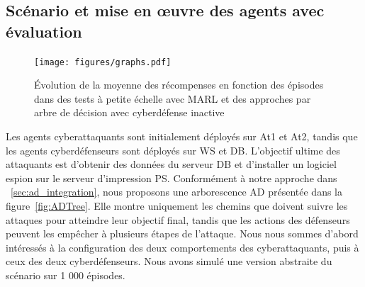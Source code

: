 


\subsection{Scénario et mise en œuvre des agents avec évaluation}

\begin{figure}
    \centering
    \texttt{[image: figures/graphs.pdf]}
    \caption{Évolution de la moyenne des récompenses en fonction des épisodes dans des tests à petite échelle avec MARL et des approches par arbre de décision avec cyberdéfense inactive
    }
    \label{fig:graphs}
\end{figure}

\noindent
Les agents cyberattaquants sont initialement déployés sur At1 et At2, tandis que les agents cyberdéfenseurs sont déployés sur WS et DB. L'objectif ultime des attaquants est d'obtenir des données du serveur DB et d'installer un logiciel espion sur le serveur d'impression PS. Conformément à notre approche dans ~\ref{sec:ad_integration}, nous proposons une arborescence AD présentée dans la figure~\ref{fig:ADTree}. Elle montre uniquement les chemins que doivent suivre les attaques pour atteindre leur objectif final, tandis que les actions des défenseurs peuvent les empêcher à plusieurs étapes de l'attaque.
Nous nous sommes d'abord intéressés à la configuration des deux comportements des cyberattaquants, puis à ceux des deux cyberdéfenseurs. Nous avons simulé une version abstraite du scénario sur 1 000 épisodes.




